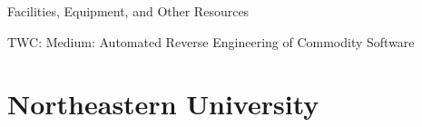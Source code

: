 \documentclass[letterpaper,twoside,11pt,headings=small]{scrartcl}
\newcommand{\basetitle}{TWC: Medium: Automated Reverse Engineering of Commodity Software}
\newcommand{\thetitle}{\basetitle\xspace}
\begin{document}







\newpage
{}
\setcounter{page}{1}
\setcounter{section}{0}

{\sffamily\bfseries
\begin{center}
\fontsize{16}{16}\selectfont Facilities, Equipment, and Other Resources

\fontsize{13}{13}\selectfont \thetitle
\end{center}
\label{sec:resources}
}

\section*{Northeastern University}
\end{document}
